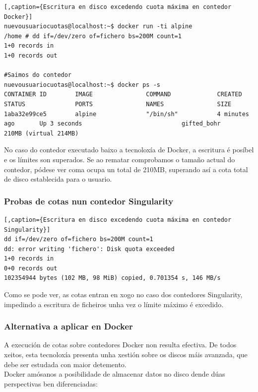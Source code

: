 \begin{lstlisting}[,caption={Escritura en disco excedendo cuota máxima en contedor Docker}]
nuevousuariocuotas@localhost:~$ docker run -ti alpine
/home # dd if=/dev/zero of=fichero bs=200M count=1
1+0 records in
1+0 records out

#Saimos do contedor
nuevousuariocuotas@localhost:~$ docker ps -s 
CONTAINER ID        IMAGE               COMMAND             CREATED             STATUS              PORTS               NAMES               SIZE
1aba32e99ce5        alpine              "/bin/sh"           4 minutes ago       Up 3 seconds                            gifted_bohr         210MB (virtual 214MB)
\end{lstlisting}

No caso do contedor executado baixo a tecnoloxía de Docker, a escritura é posíbel e os límites son superados. Se ao rematar comprobamos o tamaño actual do contedor, pódese ver coma ocupa un total de 210MB, superando así a cota total de disco establecida para o usuario.\\

\subsubsection{Probas de cotas nun contedor Singularity}

\begin{lstlisting}[,caption={Escritura en disco excedendo cuota máxima en contedor Singularity}]
dd if=/dev/zero of=fichero bs=200M count=1
dd: error writing 'fichero': Disk quota exceeded
1+0 records in
0+0 records out
102354944 bytes (102 MB, 98 MiB) copied, 0.701354 s, 146 MB/s
\end{lstlisting}

Como se pode ver, as cotas entran en xogo no caso dos contedores Singularity, impedindo a escritura de ficheiros unha vez o límite máximo é excedido.\\

\subsubsection{Alternativa a aplicar en Docker}

A execución de cotas sobre contedores Docker non resulta efectiva. De todos xeitos, esta tecnoloxía presenta unha xestión sobre os discos máis avanzada, que debe ser estudada con maior detemento.\\

Docker amósanos a posibilidade de almacenar datos no disco dende dúas perspectivas ben diferenciadas:

